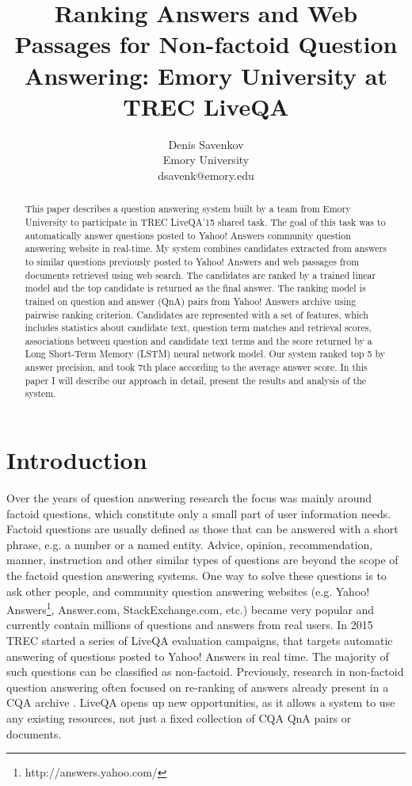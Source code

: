 \documentclass[]{article}
\title{Ranking Answers and Web Passages for Non-factoid Question Answering: Emory University at TREC LiveQA}
\author{Denis Savenkov\\Emory University\\dsavenk@emory.edu}
\date{}
\begin{document}
\maketitle

\begin{abstract}
This paper describes a question answering system built by a team from Emory University to participate in TREC LiveQA'15 shared task.
The goal of this task was to automatically answer questions posted to Yahoo! Answers community question answering website in real-time.
My system combines candidates extracted from answers to similar questions previously posted to Yahoo! Answers and web passages from documents retrieved using web search.
The candidates are ranked by a trained linear model and the top candidate is returned as the final answer.
The ranking model is trained on question and answer (QnA) pairs from Yahoo! Answers archive using pairwise ranking criterion.
Candidates are represented with a set of features, which includes statistics about candidate text, question term matches and retrieval scores, associations between question and candidate text terms and the score returned by a Long Short-Term Memory (LSTM) neural network model.
Our system ranked top 5 by answer precision, and took 7th place according to the average answer score.
In this paper I will describe our approach in detail, present the results and analysis of the system.

\end{abstract}

\section{Introduction}
Over the years of question answering research the focus was mainly around factoid questions, which constitute only a small part of user information needs.
Factoid questions are usually defined as those that can be answered with a short phrase, e.g. a number or a named entity.
Advice, opinion, recommendation, manner, instruction and other similar types of questions are beyond the scope of the factoid question answering systems.
One way to solve these questions is to ask other people, and community question answering websites (e.g. Yahoo! Answers\footnote{http://answers.yahoo.com/}, Answer.com, StackExchange.com, etc.) became very popular and currently contain millions of questions and answers from real users.
In 2015 TREC started a series of LiveQA evaluation campaigns, that targets automatic answering of questions posted to Yahoo! Answers in real time.
The majority of such questions can be classified as non-factoid.
Previously, research in non-factoid question answering often focused on re-ranking of answers already present in a CQA archive \cite{surdeanu2011learning}.
LiveQA opens up new opportunities, as it allows a system to use any existing resources, not just a fixed collection of CQA QnA pairs or documents.
\end{document}
